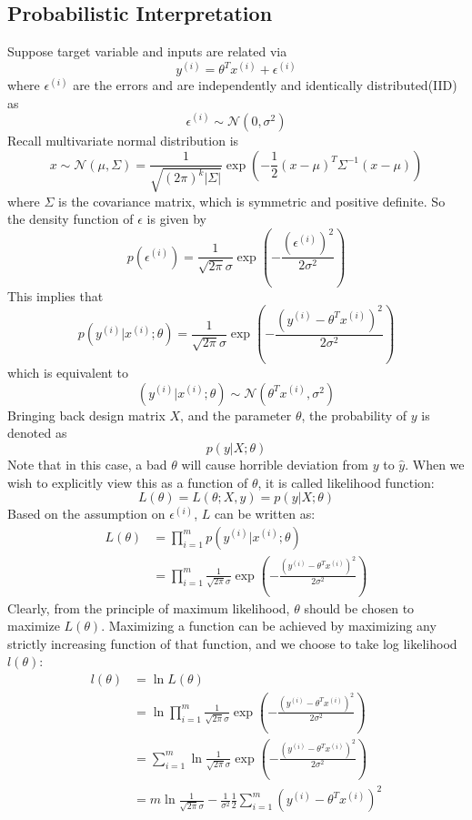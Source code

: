\documentclass[10pt,a4paper,oneside]{article}
\begin{document}
\subsection{Probabilistic Interpretation}
Suppose target variable and inputs are related via
\[
y^{(i)} = \theta^T x^{(i)} + \epsilon^{(i)}
\] 
where $\epsilon^{(i)}$ are the errors and are independently and identically distributed(IID) as
\[
\epsilon^{(i)} \sim \mathcal{N}(0, \sigma^2)
\]
Recall multivariate normal distribution is
\[
x \sim \mathcal{N} (\mu, \Sigma)= \frac{1}{\sqrt{(2\pi)^k|\Sigma|}} \exp \left( -\frac{1}{2}(x-\mu)^T \Sigma ^{-1} (x-\mu)\right)
\]
where $\Sigma$ is the covariance matrix, which is symmetric and positive definite. So the density function of $\epsilon$ is given by
\[
p(\epsilon^{(i)}) = \frac{1}{\sqrt{2\pi} \sigma} \exp \left(-\frac{(\epsilon^{(i)})^2}{2\sigma^2} \right)
\]
This implies that
\[
p(y^{(i)}|x^{(i)}; \theta) = \frac{1}{\sqrt{2\pi} \sigma} \exp \left(-\frac{( y^{(i)} - \theta^T x^{(i)})^2}{2\sigma^2} \right)
\]
which is equivalent to
\[
\left( y^{(i)} | x^{(i)}; \theta \right) \sim \mathcal{N}(\theta^Tx^{(i)}, \sigma^2)
\]
Bringing back design matrix $X$, and the parameter $\theta$, the probability of $y$ is denoted as
\[
p(y | X; \theta)
\]
Note that in this case, a bad $\theta$ will cause horrible deviation from $y$ to $\hat{y}$. When we wish to explicitly view this as a function of $\theta$, it is called likelihood function:
\[
L(\theta) = L(\theta; X, y) = p(y | X; \theta)
\]
Based on the assumption on $\epsilon^{(i)}$, $L$ can be written as:
\begin{align*}
	L(\theta) &= \prod_{i=1}^{m}  p(y^{(i)} | x^{(i)}; \theta)\\
	&= \prod_{i=1}^{m}   \frac{1}{\sqrt{2\pi} \sigma} \exp \left(-\frac{( y^{(i)} - \theta^T x^{(i)})^2}{2\sigma^2} \right)
\end{align*}
Clearly, from the principle of maximum likelihood, $\theta$ should be chosen to maximize $L(\theta)$. Maximizing a function can be achieved by maximizing any strictly increasing function of that function, and we choose to take log likelihood $l(\theta)$:
\begin{align*}
	l(\theta) &= \ln L(\theta)\\
	&= \ln \prod_{i=1}^{m}   \frac{1}{\sqrt{2\pi} \sigma} \exp \left(-\frac{( y^{(i)} - \theta^T x^{(i)})^2}{2\sigma^2} \right)\\
	&= \sum_{i=1}^{m} \ln  \frac{1}{\sqrt{2\pi} \sigma} \exp \left(-\frac{( y^{(i)} - \theta^T x^{(i)})^2}{2\sigma^2} \right)\\
	&= m \ln \frac{1}{\sqrt{2\pi} \sigma} - \frac{1}{\sigma^2} \frac{1}{2} \sum_{i=1}^{m} ( y^{(i)} - \theta^T x^{(i)})^2
\end{align*}
\end{document}
